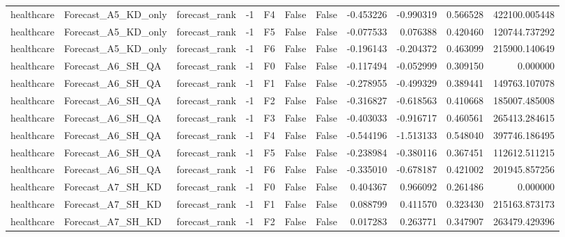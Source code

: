 \begin{tabular}{lllrlllrrrr}
healthcare &          Forecast\_A5\_KD\_only & forecast\_rank &    -1 &  F4 &           False &            False & -0.453226 & -0.990319 & 0.566528 &    422100.005448 \\
healthcare &          Forecast\_A5\_KD\_only & forecast\_rank &    -1 &  F5 &           False &            False & -0.077533 &  0.076388 & 0.420460 &    120744.737292 \\
healthcare &          Forecast\_A5\_KD\_only & forecast\_rank &    -1 &  F6 &           False &            False & -0.196143 & -0.204372 & 0.463099 &    215900.140649 \\
healthcare &            Forecast\_A6\_SH\_QA & forecast\_rank &    -1 &  F0 &           False &            False & -0.117494 & -0.052999 & 0.309150 &         0.000000 \\
healthcare &            Forecast\_A6\_SH\_QA & forecast\_rank &    -1 &  F1 &           False &            False & -0.278955 & -0.499329 & 0.389441 &    149763.107078 \\
healthcare &            Forecast\_A6\_SH\_QA & forecast\_rank &    -1 &  F2 &           False &            False & -0.316827 & -0.618563 & 0.410668 &    185007.485008 \\
healthcare &            Forecast\_A6\_SH\_QA & forecast\_rank &    -1 &  F3 &           False &            False & -0.403033 & -0.916717 & 0.460561 &    265413.284615 \\
healthcare &            Forecast\_A6\_SH\_QA & forecast\_rank &    -1 &  F4 &           False &            False & -0.544196 & -1.513133 & 0.548040 &    397746.186495 \\
healthcare &            Forecast\_A6\_SH\_QA & forecast\_rank &    -1 &  F5 &           False &            False & -0.238984 & -0.380116 & 0.367451 &    112612.511215 \\
healthcare &            Forecast\_A6\_SH\_QA & forecast\_rank &    -1 &  F6 &           False &            False & -0.335010 & -0.678187 & 0.421002 &    201945.857256 \\
healthcare &            Forecast\_A7\_SH\_KD & forecast\_rank &    -1 &  F0 &           False &            False &  0.404367 &  0.966092 & 0.261486 &         0.000000 \\
healthcare &            Forecast\_A7\_SH\_KD & forecast\_rank &    -1 &  F1 &           False &            False &  0.088799 &  0.411570 & 0.323430 &    215163.873173 \\
healthcare &            Forecast\_A7\_SH\_KD & forecast\_rank &    -1 &  F2 &           False &            False &  0.017283 &  0.263771 & 0.347907 &    263479.429396 \\

\end{tabular}
